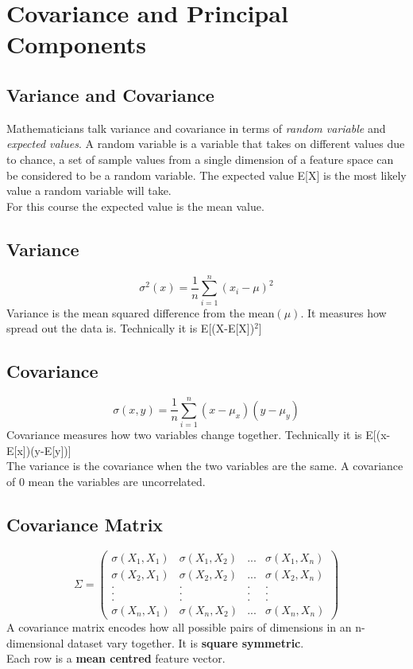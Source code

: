\documentclass{article}
\begin{document}
	\section{Covariance and Principal Components}
	\subsection{Variance and Covariance}
	Mathematicians talk variance and covariance in terms of \textit{random variable} and \textit{expected values}. A random variable is a variable that takes on different values due to chance, a set of sample values from a single dimension of a feature space can be considered to be a random variable. The expected value E[X] is the most likely value a random variable will take.\\
	For this course the expected value is the mean value.
	\subsection{Variance}
	$$\sigma^2(x)=\frac{1}{n}\sum_{i=1}^{n}(x_i-\mu)^2$$
	Variance is the mean squared difference from the mean$(\mu)$. It measures how spread out the data is. Technically it is E[(X-E[X])$^2$]
	\subsection{Covariance}
	$$\sigma(x,y)=\frac{1}{n}\sum_{i=1}^{n}(x-\mu_x)(y-\mu_y)$$
	Covariance measures how two variables change together. Technically it is E[(x-E[x])(y-E[y])]\\
	The variance is the covariance when the two variables are the same. A covariance of 0 mean the variables are uncorrelated.
	\subsection{Covariance Matrix}
	\[\Sigma = \left(\begin{array}{cccc}
	\sigma(X_1,X_1) & \sigma(X_1,X_2) & ... & \sigma(X_1,X_n) \\
	\sigma(X_2,X_1) & \sigma(X_2,X_2) & ... & \sigma(X_2,X_n) \\
	. & . & . & . \\
	. & . & . & . \\
	. & . & . & . \\
	\sigma(X_n,X_1) & \sigma(X_n,X_2) & ... & \sigma(X_n,X_n) \end{array}\right)\]
	A covariance matrix encodes how all possible pairs of dimensions in an n-dimensional dataset vary together. It is \textbf{square symmetric}.\\
	Each row is a \textbf{mean centred} feature vector.
\end{document}
